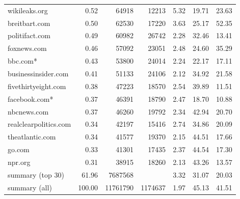 \begin{tabular}{lrrrrrr}
wikileaks.org         &    0.52 &     64918 &    12213 &         5.32 &         19.71 &         23.63 \\
breitbart.com         &    0.50 &     62530 &    17220 &         3.63 &         25.17 &         52.35 \\
politifact.com        &    0.49 &     60982 &    26742 &         2.28 &         32.46 &         13.41 \\
foxnews.com           &    0.46 &     57092 &    23051 &         2.48 &         24.60 &         35.29 \\
bbc.com*              &    0.43 &     53800 &    24014 &         2.24 &         22.17 &         17.11 \\
businessinsider.com   &    0.41 &     51133 &    24106 &         2.12 &         34.92 &         21.58 \\
fivethirtyeight.com   &    0.38 &     47223 &    18570 &         2.54 &         39.89 &         11.51 \\
facebook.com*         &    0.37 &     46391 &    18790 &         2.47 &         18.70 &         10.88 \\
nbcnews.com           &    0.37 &     46260 &    19792 &         2.34 &         42.94 &         20.70 \\
realclearpolitics.com &    0.34 &     42197 &    15416 &         2.74 &         34.86 &         20.09 \\
theatlantic.com       &    0.34 &     41577 &    19370 &         2.15 &         44.51 &         17.66 \\
go.com                &    0.33 &     41301 &    17435 &         2.37 &         44.54 &         17.30 \\
npr.org               &    0.31 &     38915 &    18260 &         2.13 &         43.26 &         13.57 \\
summary (top 30)      &   61.96 &   7687568 &          &         3.32 &         31.07 &         20.03 \\
summary (all)         &  100.00 &  11761790 &  1174637 &         1.97 &         45.13 &         41.51 \\
\bottomrule
\end{tabular}
